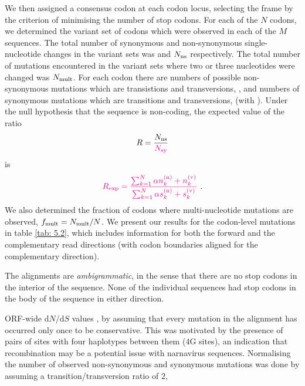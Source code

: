 \documentclass[unnumsec,webpdf,contemporary,large,namedate]{oup-authoring-template}%
\theoremstyle{thmstyleone}%
\theoremstyle{thmstyletwo}%
\theoremstyle{thmstylethree}%
\begin{document}
We then assigned a consensus codon at each codon locus, selecting the
frame by the criterion of minimising the number of stop codons.
For each of the $N$ codons, we determined the variant set of codons
which were observed in each of the $M$ sequences. The total
number of synonymous and non-synonymous single-nucleotide changes in the variant sets
was  and $N_{\rm ns}$ respectively. The total number of mutations
encountered in the variant sets where two or three nucleotides were changed was $N_{\rm mult}$.
For each codon there are
numbers of possible non-synonymous mutations which are transistions and transversions,
, and numbers of synonymous mutations
which are transitions and transversions, 
(with ). Under the null
hypothesis that the sequence is non-coding, the expected value of the ratio
%
\begin{equation}
\label{eq: 5.2}
R=\frac{N_{\rm ns}}{{\color{magenta}{N_{\rm sy}}}}
\end{equation}
%
is
%
\begin{equation}
\label{eq: 5.3}
{\color{magenta}{R_{\rm exp}=\frac{\sum_{k=1}^N\alpha n_k^{({\rm n})}+n_k^{({\rm v})}}
{\sum_{k=1}^N\alpha s_k^{({\rm n})}+s_k^{({\rm v})}}}}
\ .
\end{equation}
%
We also determined the fraction of codons where multi-nucleotide mutations are observed,
$f_{\rm mult}=N_{\rm mult}/N$.
We present our results for the codon-level mutations in table \ref{tab: 5.2}, which includes information
for both the forward and the complementary read directions (with codon boundaries aligned
for the complementary direction).

The alignments are \emph{ambigrammatic}, in the sense that there are no stop codons in the
interior of the sequence. None of the individual sequences had stop codons in the body of the
sequence in either direction.

 ORF-wide d$N$/d$S$ values , 
by assuming that every mutation in the alignment has occurred only once to be conservative. 
This was motivated by the presence of pairs of sites with four haplotypes between them ($4$G sites), an
indication that recombination may be a potential issue with narnavirus
sequences.  Normalising the number of observed non-synonymous and synonymous
mutations was done by assuming a transition/transversion ratio of $2$, 
\end{document}
